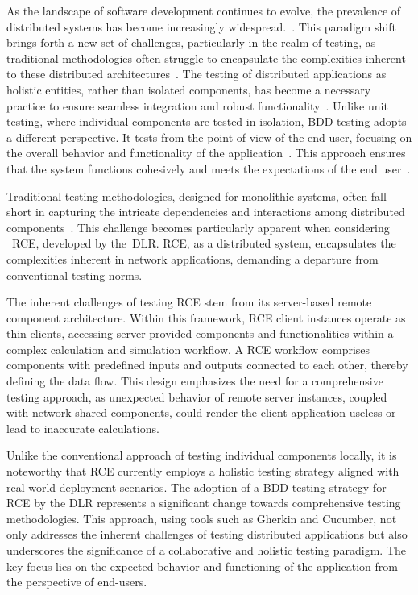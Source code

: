 As the landscape of software development continues to evolve, the prevalence of distributed systems has become increasingly widespread.~\cite{Xingang2018,Feldman1978}. This paradigm shift brings forth a new set of challenges, particularly in the realm of testing, as traditional methodologies often struggle to encapsulate the complexities inherent to these distributed architectures~\cite{Liu,Lima2017}. The testing of distributed applications as holistic entities, rather than isolated components, has become a necessary practice to ensure seamless integration and robust functionality~\cite{Liu,Lima2017}.
Unlike unit testing, where individual components are tested in isolation, \acf{BDD} testing adopts a different perspective. It tests from the point of view of the end user, focusing on the overall behavior and functionality of the application~\cite{wynne2012cucumber}. This approach ensures that the system functions cohesively and meets the expectations of the end user~\cite{wynne2012cucumber}.

Traditional testing methodologies, designed for monolithic systems, often fall short in capturing the intricate dependencies and interactions among distributed components~\cite{Liu,Lima2017}. This challenge becomes particularly apparent when considering ~\acf{RCE}, developed by the~\acf{DLR}. \ac{RCE}, as a distributed system, encapsulates the complexities inherent in network applications, demanding a departure from conventional testing norms.


The inherent challenges of testing \ac{RCE} stem from its server-based remote component architecture. Within this framework, \ac{RCE} client instances operate as thin clients, accessing server-provided components and functionalities within a complex calculation and simulation workflow. A \ac{RCE} workflow comprises components with predefined inputs and outputs connected to each other, thereby defining the data flow. This design emphasizes the need for a comprehensive testing approach, as unexpected behavior of remote server instances, coupled with network-shared components, could render the client application useless or lead to inaccurate calculations.

Unlike the conventional approach of testing individual components locally, it is noteworthy that \ac{RCE} currently employs a holistic testing strategy aligned with real-world deployment scenarios. The adoption of a \ac{BDD} testing strategy for \ac{RCE} by the \ac{DLR} represents a significant change towards comprehensive testing methodologies. This approach, using tools such as Gherkin and Cucumber, not only addresses the inherent challenges of testing distributed applications but also underscores the significance of a collaborative and holistic testing paradigm. The key focus lies on the expected behavior and functioning of the application from the perspective of end-users.

